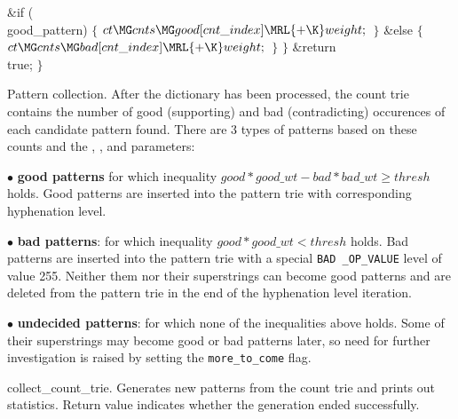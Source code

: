 \&{if} (\\{good\_pattern})\5
${}\{{}$\1\6
${}\\{ct}\MG\\{cnts}\MG\\{good}[\\{cnt\_index}]\MRL{+{\K}}\\{weight};{}$\6
\4${}\}{}$\2\6
\&{else}\5
${}\{{}$\1\6
${}\\{ct}\MG\\{cnts}\MG\\{bad}[\\{cnt\_index}]\MRL{+{\K}}\\{weight};{}$\6
\4${}\}{}$\2\6
\4${}\}{}$\2\6
\&{return} \\{true};\6
\4${}\}{}$\2\par
\fi

Pattern collection.
After the dictionary has been processed, the count trie contains the number of
good (supporting) and bad
(contradicting) occurences of each candidate pattern found. There are 3 types
of patterns based on these counts and the
\goodwtpar{}, \badwtpar{}, and \threshpar{} parameters:

\item{$\bullet$} {\bf good patterns} for which inequality
$
good * good\_wt - bad * bad\_wt \geq thresh
$
holds. Good patterns are inserted into the pattern trie with corresponding
hyphenation level.
\item{$\bullet$} {\bf bad patterns}: for which inequality
$
good * good\_wt < thresh
$
holds. Bad patterns are inserted into the pattern trie with a special {\tt BAD%
\_OP\_VALUE} level of value
255. Neither them nor their superstrings can become good patterns and are
deleted from the pattern trie in the
end of the hyphenation level iteration.
\item{$\bullet$} {\bf undecided patterns}: for which none of the inequalities
above holds. Some of their superstrings may
become good or bad patterns later, so need for further investigation is raised
by setting the
{\tt more\_to\_come} flag.

\fi

collect\_count\_trie.
Generates new patterns from the count trie and prints out statistics. Return
value indicates whether the generation
ended successfully.

